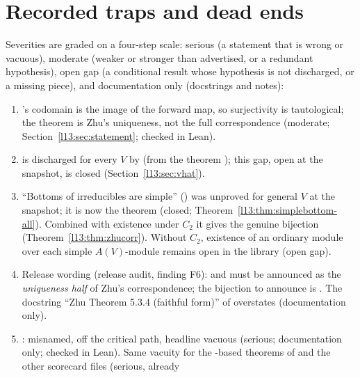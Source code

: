 \section{Recorded traps and dead ends}\label{l13:sec:traps}

Severities are graded on a four-step scale: serious (a statement that is wrong or vacuous), moderate (weaker or stronger than advertised, or a redundant
hypothesis), open gap (a conditional result whose hypothesis is not discharged, or a missing piece), and documentation
only (docstrings and notes):
\begin{enumerate}
\item {}'s codomain is the image of the forward map, so surjectivity is tautological; the theorem is Zhu's
  uniqueness, not the full correspondence (moderate; Section~\ref{l13:sec:statement}; checked in Lean).
\item {} is discharged for every $V$ by
   (from the theorem ); this gap, open at the snapshot, is closed
  (Section~\ref{l13:sec:vhat}).
\item ``Bottoms of irreducibles are simple'' () was unproved for general $V$ at the snapshot; it is now the
  theorem  (closed; Theorem~\ref{l13:thm:simplebottom-all}). Combined with existence under $C_2$ it gives
  the genuine bijection  (Theorem~\ref{l13:thm:zhucorr}). Without $C_2$, existence of an
  ordinary module over each simple $A(V)$-module remains open in the library (open gap).
\item Release wording (release audit, finding F6):  and  must be announced as the
  \emph{uniqueness half} of Zhu's correspondence; the bijection to announce is . The
  docstring ``Zhu Theorem 5.3.4 (faithful form)'' of  overstates (documentation only).
\item {}: misnamed, off the critical path, headline vacuous (serious; documentation only; checked in Lean). Same vacuity for the
  -based theorems of  and the other scorecard files (serious, already

\end{enumerate}
